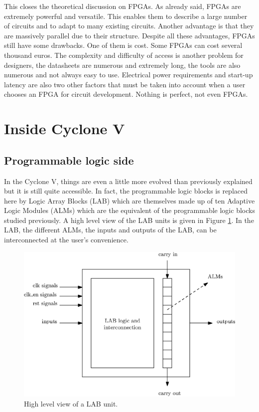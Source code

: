 This closes the theoretical discussion on FPGAs. As already said, FPGAs are extremely 
powerful and versatile. This enables them to describe a large number of circuits and to adapt to
many existing circuits. Another advantage is that they are massively parallel due to their 
structure. Despite all these 
advantages, FPGAs still have some drawbacks. One of them is cost. Some FPGAs can cost several 
thousand euros. The complexity and difficulty of access is another problem for designers, the 
datasheets are numerous and extremely long, the tools are also numerous and not always easy to use. 
Electrical power requirements and start-up latency are also two other factors that must be taken 
into account when a user chooses an FPGA for circuit development. Nothing is perfect, not even 
FPGAs.

\section{Inside Cyclone V}

\subsection{Programmable logic side}

In the Cyclone V, things are even a little more evolved than previously explained but it is still quite 
accessible. In fact, the programmable logic blocks is replaced here by Logic Array Blocks (LAB) 
which are themselves made up of ten Adaptive Logic Modules (ALMs) which are the equivalent of 
the programmable logic blocks studied previously. A high level view of the LAB units is given in
Figure \ref{fig:cyc5/lab}. In the LAB, the different ALMs, the inputs and outputs of the LAB, can be 
interconnected at the user's convenience.

\begin{figure}[H]
    \centering
    \includegraphics[scale=0.8]{Chapter1-Hardware/res/lab_block.eps}
    \caption{High level view of a LAB unit.}
    \label{fig:cyc5/lab}
\end{figure}

